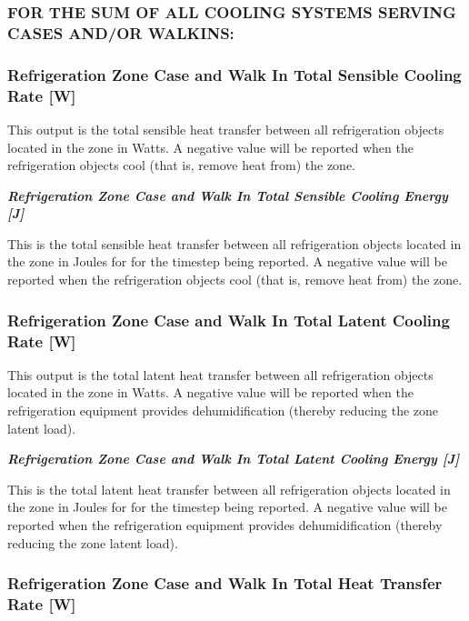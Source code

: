 \subsubsection{FOR THE SUM OF ALL COOLING SYSTEMS SERVING CASES AND/OR WALKINS:}\label{for-the-sum-of-all-cooling-systems-serving-cases-andor-walkins}

\subsubsection{Refrigeration Zone Case and Walk In Total Sensible Cooling Rate {[}W{]}}\label{refrigeration-zone-case-and-walk-in-total-sensible-cooling-rate-w}

This output is the total sensible heat transfer between all refrigeration objects located in the zone in Watts. A negative value will be reported when the refrigeration objects cool (that is, remove heat from) the zone.

\textbf{\emph{Refrigeration Zone Case and Walk In Total Sensible Cooling Energy {[}J{]}}}

This is the total sensible heat transfer between all refrigeration objects located in the zone in Joules for for the timestep being reported. A negative value will be reported when the refrigeration objects cool (that is, remove heat from) the zone.

\subsubsection{Refrigeration Zone Case and Walk In Total Latent Cooling Rate {[}W{]}}\label{refrigeration-zone-case-and-walk-in-total-latent-cooling-rate-w}

This output is the total latent heat transfer between all refrigeration objects located in the zone in Watts. A negative value will be reported when the refrigeration equipment provides dehumidification (thereby reducing the zone latent load).

\textbf{\emph{Refrigeration Zone Case and Walk In Total Latent Cooling Energy {[}J{]}}}

This is the total latent heat transfer between all refrigeration objects located in the zone in Joules for for the timestep being reported. A negative value will be reported when the refrigeration equipment provides dehumidification (thereby reducing the zone latent load).

\subsubsection{Refrigeration Zone Case and Walk In Total Heat Transfer Rate {[}W{]}}\label{refrigeration-zone-case-and-walk-in-total-heat-transfer-rate-w}

